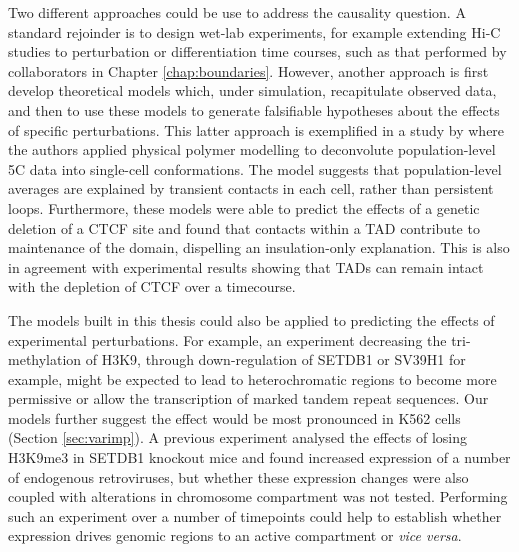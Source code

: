 \documentclass[a4paper,11pt,oneside]{book}
\begin{document}
Two different approaches could be use to address the causality question. A standard rejoinder is to design wet-lab experiments, for example extending Hi-C studies to perturbation or differentiation time courses, such as that performed by collaborators in Chapter \ref{chap:boundaries}. However, another approach is first develop theoretical models which, under simulation, recapitulate observed data, and then to use these models to generate falsifiable hypotheses about the effects of specific perturbations. This latter approach is exemplified in a study by \citet{Giorgetti2014a} where the authors applied physical polymer modelling to deconvolute population-level 5C data into single-cell conformations. The model suggests that population-level averages are explained by transient contacts in each cell, rather than persistent loops. Furthermore, these models were able to predict the effects of a genetic deletion of a CTCF site and found that contacts within a TAD contribute to maintenance of the domain, dispelling an insulation-only explanation.\cite{Giorgetti2014a} This is also in agreement with experimental results showing that TADs can remain intact with the depletion of CTCF over a timecourse.\cite{Zuin2013}

The models built in this thesis could also be applied to predicting the effects of experimental perturbations. For example, an experiment decreasing the tri-methylation of H3K9, through down-regulation of SETDB1 or SV39H1 for example, might be expected to lead to heterochromatic regions to become more permissive or allow the transcription of marked tandem repeat sequences.\cite{Kim2012}  Our models further suggest the effect would be most pronounced in K562 cells (Section \ref{sec:varimp}). A previous experiment analysed the effects of losing H3K9me3 in SETDB1 knockout mice and found increased expression of a number of endogenous retroviruses,\cite{Karimi2011} but whether these expression changes were also coupled with alterations in chromosome compartment was not tested. Performing such an experiment over a number of timepoints could help to establish whether expression drives genomic regions to an active compartment or \emph{vice versa}.

%
%
\end{document}
